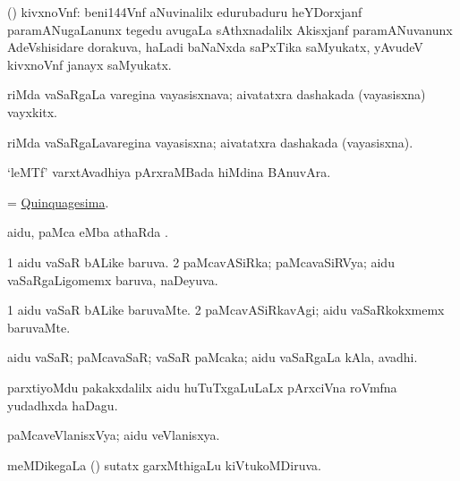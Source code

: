 \bentry
{}
\gl{\nA}
\bmng
(\ravi) kivxnoVnf: 
\banum
{} beni\char144Vnf aNuvinalilx edurubaduru heYDorxjanf paramANugaLanunx tegedu avugaLa sAthxnadalilx Akisxjanf paramANuvanunx AdeVshisidare dorakuva, haLadi baNaNxda saPxTika saMyukatx,  
 yAvudeV kivxnoVnf janayx saMyukatx. 
\eanum
\emng
\eentry

\bentry
{}
\gl{\nA}
\bmng
{}riMda  vaSaRgaLa varegina vayasisxnava; aivatatxra dashakada (vayasisxna) vayxkitx. 
\emng
\eentry

\bentry
{}
\gl{\gu}
\bmng
{}riMda  vaSaRgaLavaregina vayasisxna; aivatatxra dashakada (vayasisxna). 
\emng
\eentry

\bentry
{}
\gl{\nA}
\bmng
`leMTf' varxtAvadhiya pArxraMBada hiMdina BAnuvAra. 
\emng
\eentry

\bentry
{}
\gl{\nA}
\bmng
= \hyperlink{Quinquagesima}{Quinquagesima}. 
\emng
\eentry

\bentry
{}
\gl{\sapUpa}
\bmng
aidu, paMca eMba athaRda \sapUpa. 
\emng
\eentry

\bentry
{}
\gl{\gu}
\bmng
\bnum
\num{1} aidu vaSaR bALike baruva. 
\num{2} paMcavASiRka; paMcavaSiRVya; aidu vaSaRgaLigomemx baruva, naDeyuva. 
\enum
\emng
\eentry

\bentry
{}
\gl{\kirxvi}
\bmng
\bnum
\num{1} aidu vaSaR bALike baruvaMte. 
\num{2} paMcavASiRkavAgi; aidu vaSaRkokxmemx baruvaMte. 
\enum
\emng
\eentry

\bentry
{}
\gl{\nA}
\bmng
aidu vaSaR; paMcavaSaR; vaSaR paMcaka; aidu vaSaRgaLa kAla, avadhi. 
\emng
\eentry

\bentry
{}
\gl{\nA}
\bmng
parxtiyoMdu pakakxdalilx aidu huTuTxgaLuLaLx pArxciVna roVmfna yudadhxda haDagu. 
\emng
\eentry

\bentry
{}
\gl{\gu}
\bmng
paMcaveVlanisxVya; aidu veVlanisxya. 
\emng
\eentry

\bentry
{}
\gl{\gu}
\bmng
meMDikegaLa () sutatx garxMthigaLu kiVtukoMDiruva. 
\emng
\eentry

